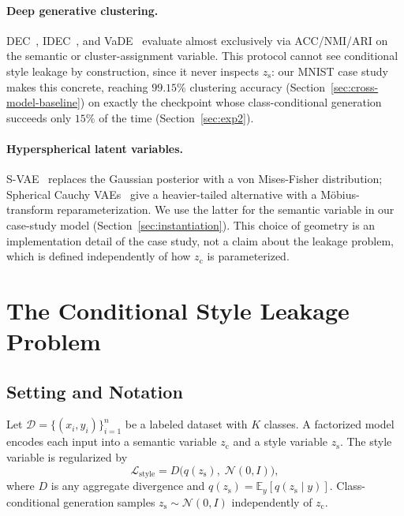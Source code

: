 \documentclass[10pt,letterpaper]{article}
\newcommand{\zc}{z_{\mathrm{c}}}
\newcommand{\zs}{z_{\mathrm{s}}}
\begin{document}
\paragraph{Deep generative clustering.}
DEC~\citep{xie2015unsupervised}, IDEC~\citep{guo2017improved}, and
VaDE~\citep{jiang2016variational} evaluate almost exclusively via
ACC/NMI/ARI on the semantic or cluster-assignment variable. This protocol
cannot see conditional style leakage by construction, since it never
inspects $\zs$: our MNIST case study makes this concrete, reaching
$99.15\%$ clustering accuracy (Section~\ref{sec:cross-model-baseline}) on
exactly the checkpoint whose class-conditional generation succeeds only
$15\%$ of the time (Section~\ref{sec:exp2}).

\paragraph{Hyperspherical latent variables.}
S-VAE~\citep{davidson2018hyperspherical} replaces the Gaussian posterior
with a von Mises-Fisher distribution; Spherical Cauchy
VAEs~\citep{sablica2025hyperspherical} give a heavier-tailed alternative
with a M\"obius-transform reparameterization. We use the latter for the
semantic variable in our case-study model (Section~\ref{sec:instantiation}).
This choice of geometry is an implementation detail of the case study, not
a claim about the leakage problem, which is defined independently of how
$\zc$ is parameterized.

\section{The Conditional Style Leakage Problem}
\label{sec:phenomenon}

\subsection{Setting and Notation}

Let $\mathcal{D}=\{(x_i,y_i)\}_{i=1}^n$ be a labeled dataset with $K$
classes. A factorized model encodes each input into a semantic variable
$\zc$ and a style variable $\zs$. The style variable is regularized by
\begin{equation}
  \mathcal{L}_{\mathrm{style}} = D\!\bigl(q(\zs),\;\mathcal{N}(0,I)\bigr),
  \label{eq:generic-style-reg}
\end{equation}
where $D$ is any aggregate divergence and $q(\zs)=\mathbb{E}_y[q(\zs\mid y)]$.
Class-conditional generation samples $\zs\sim\mathcal{N}(0,I)$ independently
of $\zc$.
\end{document}
